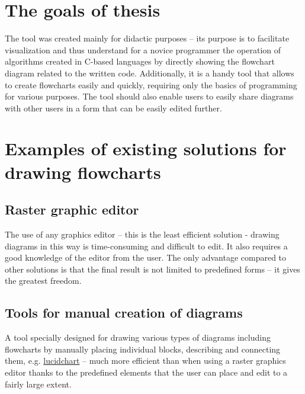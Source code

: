 \section{The goals of thesis}
The tool was created mainly for didactic purposes -- its purpose is to facilitate visualization and thus understand for a novice programmer the operation of algorithms created in C-based languages by directly showing the flowchart diagram related to the written code. Additionally, it is a handy tool that allows to create flowcharts easily and quickly, requiring only the basics of programming for various purposes. The tool should also enable users to easily share diagrams with other users in a form that can be easily edited further.
	
\section{Examples of existing solutions for drawing flowcharts}

	\subsection{Raster graphic editor} 
	The use of any graphics editor -- this is the least efficient solution - drawing diagrams in this way is time-consuming and difficult to edit. It also requires a good knowledge of the editor from the user. The only advantage compared to other solutions is that the final result is not limited to predefined forms -- it gives the greatest freedom.
		
	\subsection{Tools for manual creation of diagrams} 			
	A tool specially designed for drawing various types of diagrams including flowcharts by manually placing individual blocks, describing and connecting them, e.g. \href{https://www.lucidchart.com/pages/examples/flowchart_software}{lucidchart} -- much more efficient than when using a raster graphics editor thanks to the predefined elements that the user can place and edit to a fairly large extent.
	
